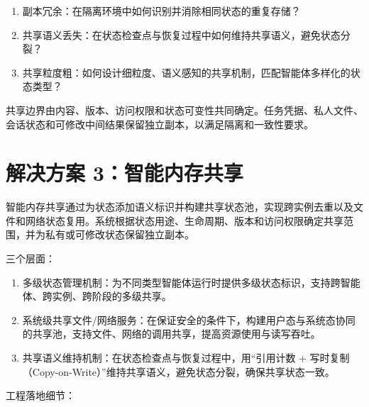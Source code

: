 \begin{enumerate}
\item 副本冗余：在隔离环境中如何识别并消除相同状态的重复存储？
\item 共享语义丢失：在状态检查点与恢复过程中如何维持共享语义，避免状态分裂？
\item 共享粒度粗：如何设计细粒度、语义感知的共享机制，匹配智能体多样化的状态类型？
\end{enumerate}
共享边界由内容、版本、访问权限和状态可变性共同确定。任务凭据、私人文件、会话状态和可修改中间结果保留独立副本，以满足隔离和一致性要求。

\section{解决方案 3：智能内存共享}\label{sec:3.7}
智能内存共享通过为状态添加语义标识并构建共享状态池，实现跨实例去重以及文件和网络状态复用。系统根据状态用途、生命周期、版本和访问权限确定共享范围，并为私有或可修改状态保留独立副本。

三个层面：

\begin{enumerate}
\item 多级状态管理机制：为不同类型智能体运行时提供多级状态标识，支持跨智能体、跨实例、跨阶段的多级共享。
\item 系统级共享文件/\allowbreak{}网络服务：在保证安全的条件下，构建用户态与系统态协同的共享池，支持文件、网络的调用共享，提高资源使用与读写吞吐。
\item 共享语义维持机制：在状态检查点与恢复过程中，用“引用计数 + 写时复制（Copy-on-Write）”维持共享语义，避免状态分裂，确保共享状态一致。
\end{enumerate}
工程落地细节：

